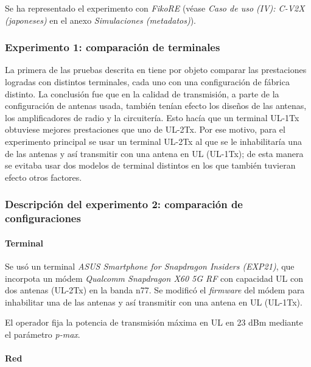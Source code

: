 \documentclass[12pt]{report} %
\begin{document}
Se ha representado el experimento con \textit{FikoRE}
(véase \textit{Caso de uso (IV): C-V2X (japoneses)} en el anexo \textit{Simulaciones (metadatos)}).

\subsubsection{Experimento 1: comparación de terminales}

La primera de las pruebas descrita en \cite{RefWorks:49} tiene por objeto comparar las prestaciones logradas con distintos terminales, cada uno con una configuración de fábrica distinto.
La conclusión fue que en la calidad de transmisión, a parte de la configuración de antenas usada, también tenían efecto los diseños de las antenas, los amplificadores de radio y la circuitería.
Esto hacía que un terminal UL-1Tx obtuviese mejores prestaciones que uno de UL-2Tx.
Por ese motivo, para el experimento principal se usar un terminal UL-2Tx
al que se le inhabilitaría una de las antenas y así transmitir con una antena en UL (UL-1Tx);
de esta manera se evitaba usar dos modelos de terminal distintos en los que también tuvieran efecto otros factores.

\subsubsection{Descripción del experimento 2: comparación de configuraciones}

\paragraph{Terminal}

Se usó un terminal \textit{ASUS Smartphone for Snapdragon Insiders (EXP21)}, que incorpota un módem \textit{Qualcomm Snapdragon X60 5G RF} con capacidad UL con dos antenas (UL-2Tx) en la banda n77.
Se modificó el \textit{firmware} del módem para inhabilitar una de las antenas y así transmitir con una antena en UL (UL-1Tx).

El operador fija la potencia de transmisión máxima en UL en 23 dBm mediante el parámetro \textit{p-max}.

\paragraph{Red}
\end{document}
